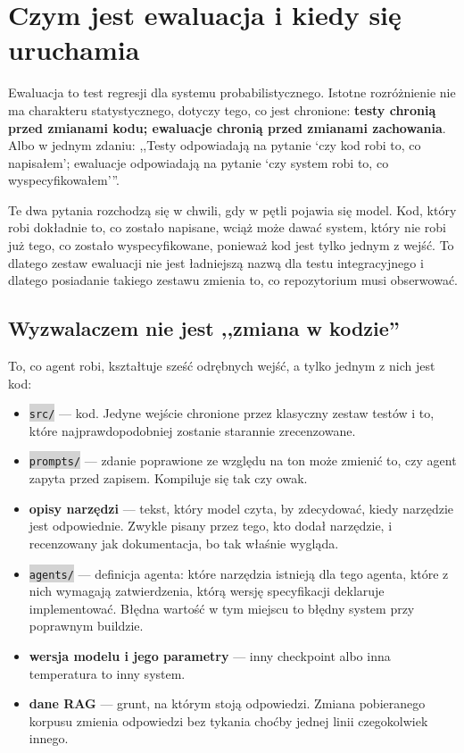 \documentclass[11pt,a4paper]{article}
\newcommand{\repopath}[1]{\colorbox{lightgray}{\texttt{#1}}}
\begin{document}
\section{Czym jest ewaluacja i kiedy się uruchamia}

Ewaluacja to test regresji dla systemu probabilistycznego. Istotne rozróżnienie
nie ma charakteru statystycznego, dotyczy tego, co jest chronione:
\textbf{testy chronią przed zmianami kodu; ewaluacje chronią przed zmianami
zachowania}. Albo w jednym zdaniu: ,,Testy odpowiadają na pytanie `czy kod robi
to, co napisałem'; ewaluacje odpowiadają na pytanie `czy system robi to, co
wyspecyfikowałem'''.

Te dwa pytania rozchodzą się w chwili, gdy w pętli pojawia się model. Kod, który
robi dokładnie to, co zostało napisane, wciąż może dawać system, który nie robi
już tego, co zostało wyspecyfikowane, ponieważ kod jest tylko jednym z wejść. To
dlatego zestaw ewaluacji nie jest ładniejszą nazwą dla testu integracyjnego i
dlatego posiadanie takiego zestawu zmienia to, co repozytorium musi obserwować.

\subsection{Wyzwalaczem nie jest ,,zmiana w kodzie''}

To, co agent robi, kształtuje sześć odrębnych wejść, a tylko jednym z nich jest
kod:

\begin{itemize}[leftmargin=*]
    \item \repopath{src/} --- kod. Jedyne wejście chronione przez klasyczny
    zestaw testów i to, które najprawdopodobniej zostanie starannie
    zrecenzowane.
    \item \repopath{prompts/} --- zdanie poprawione ze względu na ton może
    zmienić to, czy agent zapyta przed zapisem. Kompiluje się tak czy owak.
    \item \textbf{opisy narzędzi} --- tekst, który model czyta, by zdecydować,
    kiedy narzędzie jest odpowiednie. Zwykle pisany przez tego, kto dodał
    narzędzie, i recenzowany jak dokumentacja, bo tak właśnie wygląda.
    \item \repopath{agents/} --- definicja agenta: które narzędzia istnieją dla
    tego agenta, które z nich wymagają zatwierdzenia, którą wersję specyfikacji
    deklaruje implementować. Błędna wartość w tym miejscu to błędny system przy
    poprawnym buildzie.
    \item \textbf{wersja modelu i jego parametry} --- inny checkpoint albo
    inna temperatura to inny system.
    \item \textbf{dane RAG} --- grunt, na którym stoją odpowiedzi. Zmiana
    pobieranego korpusu zmienia odpowiedzi bez tykania choćby jednej linii
    czegokolwiek innego.
\end{itemize}
\end{document}
